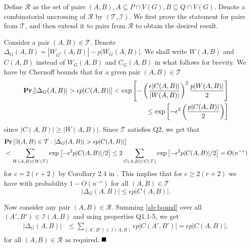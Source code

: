 \documentclass[11pt]{article}
\newcommand{\qed}{\mbox{}\hspace*{\fill}\nolinebreak\mbox{$\rule{0.6em}{0.6em}$}
}
\newcommand{\prob}{{\bf \mbox{\bf Pr}}}
\newcommand{\e}{{\epsilon}}
\newenvironment{proof}{{\bf Proof:}}{$\qed$\par}
\newcommand{\coll}{{\mathcal R}}
\newcommand{\colltwo}{{\mathcal T}}
\begin{document}
\begin{proof}
Define $\coll$ as the set of pairs $(A, B), A\subseteq P\cap V(G), B\subseteq Q\cap V(G)$. Denote a combinatorial uncrossing of $\coll$ by $(\colltwo, \mathcal{I})$.
We first prove the statement for pairs from $\colltwo$, and then extend it to pairs from $\coll$ to obtain the desired result.

Consider a pair $(A, B)\in \colltwo$.  Denote $\Delta_G(A, B)=|W_{G^*}(A, B)|-p|W_G(A, B)|$. We shall write $W(A, B)$ and $C(A, B)$ instead of $W_G(A, B)$ and $C_G(A, B)$ in what follows for brevity. We have by Chernoff bounds that for a given pair $(A, B)\in \colltwo$ 
\begin{equation*}
\begin{split}
\prob\left[\left|\Delta_{G}(A, B)\right|>\e p |C(A, B)|\right]<\exp\left[-\left(\frac{\e|C(A, B)|}{|W(A, B)|}\right)^2 \frac{p|W(A, B)|}{2} \right]\\
\leq \exp\left[-\e^2 \left( \frac{p|C(A, B)|}{2} \right) \right]
\end{split}
\end{equation*}
since $|C(A, B)|\geq |W(A, B)|$. Since $\colltwo$ satisfies Q2, we get that
\begin{equation*}
\begin{split}
&\prob\left[\exists (A, B)\in \colltwo: \left|\Delta_G(A, B)\right|>\e p|C(A, B)|\right]\\
&<\sum_{W(A, B)\in W(\colltwo)} \exp\left[-\e^2 p|C(A, B)|/2\right]\leq 2\sum_{C(A, B)\in C(\colltwo)} \exp\left[-\e^2 p|C(A, B)|/2\right]=O(n^{-r})
\end{split}
\end{equation*}
for $c=2(r+2)$ by Corollary 2.4 in \cite{kar94a}. This implies that for $c \ge 2(r+2)$ we have with probability $1-O(n^{-r})$ for all $(A, B)\in \colltwo$
\begin{equation}\label{ab-bound}
|\Delta_G(A, B)| \leq \e p| C(A,B) |.
\end{equation} 

Now consider any pair $(A, B)\in \coll$. Summing \eqref{ab-bound} over all $(A', B')\in \mathcal{I}(A,B)$ and using properties Q1.1-5, we get
\begin{equation*} 
\begin{split} 
|\Delta_G(A, B)|&\leq \sum_{(A', B')\in \mathcal{I}(A, B)}\e p|C(A', B')|=\e p|C(A, B)|,
\end{split}
\end{equation*} 
for all $(A, B)\in \coll$ as required.
\end{proof}
\end{document}
